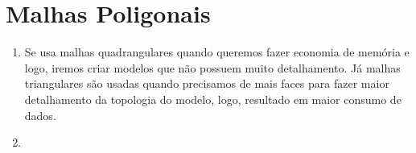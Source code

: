 \section*{Malhas Poligonais}

	\begin{enumerate}\addtocounter{enumi}{7}
	
		\item Se usa malhas quadrangulares quando queremos fazer economia de memória e 
		logo, iremos criar modelos que não possuem muito detalhamento. Já malhas triangulares
		são usadas quando precisamos de mais faces para fazer maior detalhamento da topologia
		do modelo, logo, resultado em maior consumo de dados.
		
		\item 
		
	\end{enumerate}
